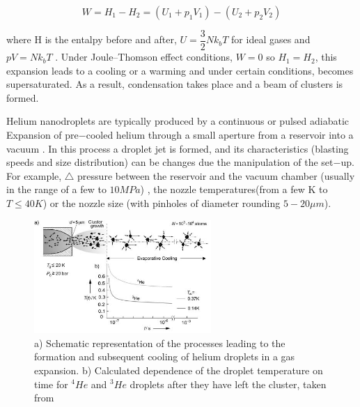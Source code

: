 \begin{equation}
W= H_{1}-H_{2} = (U_{1}+p_{1}V_{1})-(U_{2}+p_{2}V_{2})
\end{equation}

where H is the entalpy before and after, $U=\dfrac{3}{2}Nk_{b}T$ for ideal gases and $pV=Nk_{b}T$ \cite{enss_low-temperature_2005}. Under Joule–Thomson effect conditions, $W=0$ so $H_{1}=H_{2}$, this expansion leads to a cooling or a warming and under certain conditions, becomes supersaturated. As a result, condensation takes place and a beam of clusters is formed.

Helium nanodroplets are typically produced by a continuous or pulsed adiabatic Expansion of pre$-$cooled helium through a small aperture from a reservoir into a vacuum  \cite{stienkemeier_spectroscopy_2006}. In this process a droplet jet is formed, and its characteristics (blasting speeds and size distribution) can be changes due the manipulation of the set$-$up. For example, $\bigtriangleup$ pressure between the reservoir and the vacuum chamber (usually in the range of a few to $10MPa$) , the nozzle temperatures(from a few K to $T \leqslant 40K$) or the nozzle size (with pinholes of diameter rounding  $5-20 \mu m$).


\begin{figure}[h!]
\centering
	\includegraphics[width=0.6\textwidth]{../Images/jet_scketch.png}
	\caption[Scheme for a nozzle expansion]{ a) Schematic representation of the processes leading to the formation and subsequent cooling of helium droplets in a gas expansion. b) Calculated dependence of the droplet temperature on time for $^{4}He$ and $^{3}He$ droplets after they have left the cluster, taken from \cite{toennies_superfluid_2004}	}
	\label{img:jet}	
\end{figure}

